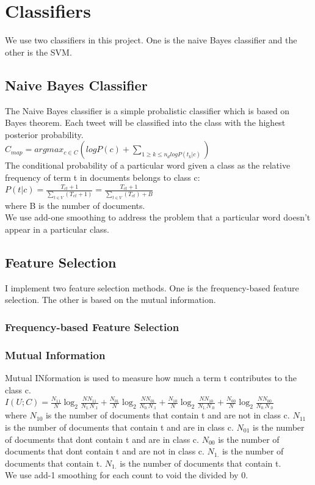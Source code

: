 \documentclass{article}
\begin{document}
\section{Classifiers}
We use two classifiers in this project. One is the naive Bayes classifier and the other is the SVM. 
\subsection{Naive Bayes Classifier}
The Naive Bayes classifier is a simple probalistic classifier which is based on Bayes theorem. Each tweet will be classified into the class with the highest posterior probability. \\
$C_{map} = argmax_{c \in C} (log P(c) + \sum_{1 \ge k \le n_d log P(t_k |c)})$\\
The conditional probability of a particular word given a class as the relative frequency of term t in documents belongs to class c:\\
$P(t|c) = \frac{T_{ct} + 1}{\sum_{t \in V}(T_{ct} + 1)} = \frac{T_{ct} + 1}{\sum_{t \in V}(T_{ct}) + B}$ \\
where B is the number of documents. \\
We use add-one smoothing to address the problem that a particular word doesn't appear in a particular class.
\subsection{Feature Selection}
I implement two feature selection methods. One is the frequency-based feature selection. The other is based on the mutual information.
\subsubsection{Frequency-based Feature Selection}
\subsubsection{Mutual Information}
Mutual INformation is used to measure how much a term t contributes to the class c. \\
$I(U; C) = \frac{N_{11}}{N} \log_2 \frac{N N_{11}}{N_{1.}N_{.1}} + \frac{N_{01}}{N} \log_2 \frac{N N_{01}}{N_{0.}N_{.1}} + \frac{N_{10}}{N} \log_2 \frac{N N_{10}}{N_{1.}N_{.0}} + \frac{N_{00}}{N}\log_2 \frac{N N_{00}}{N_{0.}N_{.0}}$\\
where $N_{10}$ is the number of documents that contain t and are not in class c. $N_{11}$ is the number of documents that contain t and are in class c. $N_{01}$ is the number of documents that dont contain t and are in class c. $N_{00}$ is the number of documents that dont contain t and are not in class c. $N_{1.}$ is the number of documents that contain t. $N_{1.}$ is the number of documents that contain t. \\
We use add-1 smoothing for each count to void the divided by 0.
\end{document}
